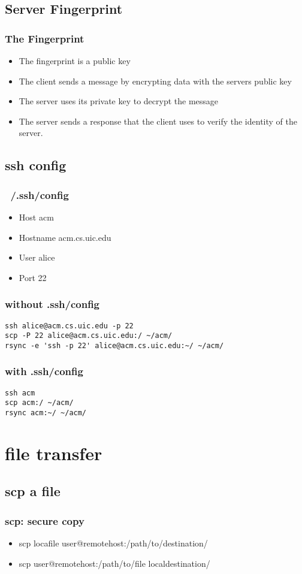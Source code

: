 \documentclass[hyperref={pdfpagelabels=false}]{beamer}
\begin{document}
\subsection{Server Fingerprint}
\frame
{
    \frametitle{The Fingerprint}
    \begin{itemize}
    \item{The fingerprint is a public key}
    \item{The client sends a message by encrypting data with the servers public key}
    \item{The server uses its private key to decrypt the message}
    \item{The server sends a response that the client uses to verify the identity of the server.}
    \end{itemize}
}
\subsection{ssh config}
\frame
{
	\frametitle{~/.ssh/config}
	\begin{itemize}
	\item{Host acm}
	\item{Hostname acm.cs.uic.edu}
	\item{User alice}
	\item{Port 22}
	\end{itemize}
}
\begin{frame}[fragile]
\frametitle{without .ssh/config}
\begin{verbatim}
ssh alice@acm.cs.uic.edu -p 22
scp -P 22 alice@acm.cs.uic.edu:/ ~/acm/
rsync -e 'ssh -p 22' alice@acm.cs.uic.edu:~/ ~/acm/
\end{verbatim}
\end{frame}
\begin{frame}[fragile]
\frametitle{with .ssh/config}
\begin{verbatim}
ssh acm
scp acm:/ ~/acm/
rsync acm:~/ ~/acm/
\end{verbatim}
\end{frame}
\section{file transfer}
\subsection{scp a file}
\frame
{
    \frametitle{scp: secure copy}
    \begin{itemize}
    \item{scp locafile user@remotehost:/path/to/destination/}
    \item{scp user@remotehost:/path/to/file localdestination/}
    \end{itemize}
}
\end{document}
